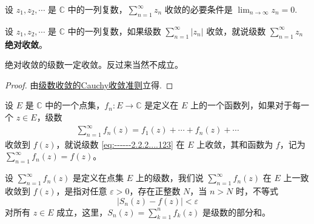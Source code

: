 \documentclass[../../main.tex]{subfiles}%
\begin{document}
\begin{corollary}\label{corollary:复幂级数收敛必要条件}
设 \( z_1, z_2, \cdots \) 是 \( \mathbb{C} \) 中的一列复数，\( \sum_{n=1}^{\infty} z_n \) 收敛的必要条件是 \( \lim_{n \to \infty} z_n = 0 \).
\end{corollary}

\begin{definition}
设 \( z_1, z_2, \cdots \) 是 \( \mathbb{C} \) 中的一列复数，如果级数 \( \sum_{n=1}^{\infty} |z_n| \) 收敛，就说级数 \( \sum_{n=1}^{\infty} z_n \) \textbf{绝对收敛}。
\end{definition}

\begin{proposition}
绝对收敛的级数一定收敛。反过来当然不成立。
\end{proposition}
\begin{proof}

由\hyperref[theorem:复数域的Cauchy收敛准则]{级数收敛的Cauchy收敛准则}立得.

\end{proof}

\begin{definition}
设 \( E \) 是 \( \mathbb{C} \) 中的一个点集，\( f_n: E \to \mathbb{C} \) 是定义在 \( E \) 上的一个函数列，如果对于每一个 \( z \in E \)，级数
\begin{align}
\sum_{n=1}^{\infty} f_n(z) = f_1(z) + \cdots + f_n(z) + \cdots\label{eq:------2.2.2....123}
\end{align}
收敛到 \( f(z) \)，就说级数 \eqref{eq:------2.2.2....123} 在 \( E \) 上收敛，其和函数为 \( f \)，记为 \( \sum_{n=1}^{\infty} f_n(z) = f(z) \)。
\end{definition}

\begin{definition}
设 \( \sum_{n=1}^{\infty} f_n(z) \) 是定义在点集 \( E \) 上的级数，我们说 \( \sum_{n=1}^{\infty} f_n(z) \) 在 \( E \) 上一致收敛到 \( f(z) \)，是指对任意 \( \varepsilon > 0 \)，存在正整数 \( N \)，当 \( n > N \) 时，不等式
\[
|S_n(z) - f(z)| < \varepsilon
\]
对所有 \( z \in E \) 成立，这里，\( S_n(z) = \sum_{k=1}^{n} f_k(z) \) 是级数的部分和。
\end{definition}
\end{document}
